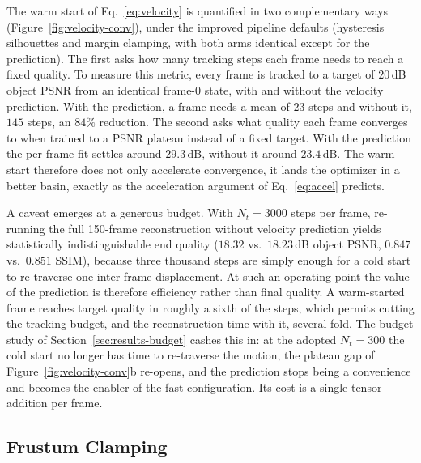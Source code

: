 The warm start of Eq.~\eqref{eq:velocity} is quantified in two complementary ways
(Figure~\ref{fig:velocity-conv}), under the improved pipeline defaults (hysteresis
silhouettes and margin clamping, with both arms identical except for the
prediction). The first asks how many tracking steps each frame needs to reach a
fixed quality. To measure this metric, every frame is tracked to a target of $20$\,dB
object PSNR from an identical frame-0 state, with and without the velocity prediction.
With the prediction, a frame needs a mean of $23$ steps and without it, $145$ steps, an
$84\%$ reduction. The second asks what quality each frame converges to
when trained to a PSNR plateau instead of a fixed target. With the prediction the
per-frame fit settles around $29.3$\,dB, without it around $23.4$\,dB. The warm start
therefore does not only accelerate convergence, it lands the optimizer in a better
basin, exactly as the acceleration argument of Eq.~\eqref{eq:accel} predicts.

A caveat emerges at a generous budget. With
$N_t = 3000$ steps per frame, re-running the full
150-frame reconstruction without velocity prediction yields statistically
indistinguishable end quality ($18.32$ vs.\ $18.23$\,dB object PSNR, $0.847$ vs.\
$0.851$ SSIM), because three thousand steps are simply enough for a cold start to re-traverse
one inter-frame displacement. At such an operating point the value of the prediction
is therefore efficiency rather than final quality. A warm-started frame reaches
target quality in roughly a sixth of the steps, which permits cutting the
tracking budget, and the reconstruction time with it, several-fold. The
budget study of Section~\ref{sec:results-budget} cashes this in: at the adopted
$N_t = 300$ the cold start no longer has time to re-traverse the motion, the plateau
gap of Figure~\ref{fig:velocity-conv}b re-opens, and the prediction stops being a
convenience and becomes the enabler of the fast configuration. Its cost is a single
tensor addition per frame.

\subsection{Frustum Clamping}
\label{sec:results-snap}

